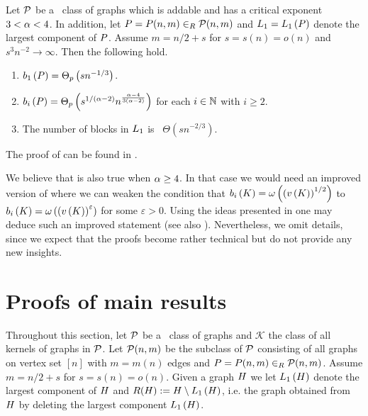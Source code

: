 \begin{thm}\label{CBthm:block_structure_general}
	Let $\mathcal{P}$ be a \pl\ class of graphs which is addable and has a critical exponent $3<\alpha<4$. In addition, let $P=P(n,m)\in_R \mathcal{P}(n,m)$ and $L_1=L_1\left(P\right)$ denote the largest component of $P$. Assume $m=n/2+s$ for $s=s(n)=o\left(n\right)$ and $s^3n^{-2} \to \infty$. Then the following hold.
	\begin{enumerate}
		\item\label{CBthm:block_structure_general_a}
		$b_{1}\left(P\right)=\Theta_p\left(sn^{-1/3}\right)$.
		\item\label{CBthm:block_structure_general_b}
		$b_{i}\left(P\right)=\Theta_p\left(s^{1/\left(\alpha-2\right)}n^{\frac{\alpha-4}{3(\alpha-2)}}\right)$ for each $i\in \mathbb{N}$ with $i\geq 2$.
		\item\label{CBthm:block_structure_general_c}
		The number of blocks in $L_1$ is \whp\ $\Theta\left(sn^{-2/3}\right)$.
	\end{enumerate}
\end{thm}
The proof of  can be found in .
\begin{remark}\label{CBrem:block_structure}
	We believe that  is also true when $\alpha\geq 4$. In that case we would need an improved version of  where we can weaken the condition that $b_{i}\left(K\right)=\omega\left(\left(v\left({K}\right)\right)^{1/2}\right)$ to $b_{i}\left(K\right)=\omega\left(\left(v\left({K}\right)\right)^{\varepsilon}\right)$ for some $\varepsilon>0$. Using the ideas presented in  one may deduce such an improved statement (see also ). Nevertheless, we omit details, since we expect that the proofs become rather technical but do not provide any new insights. 
\end{remark}

\section{Proofs of main results}\label{CBsec:proofs_main}
Throughout this section, let $\mathcal{P}$ be a \pl\ class of graphs and $\mathcal{K}$ the class of all kernels of graphs in $\mathcal{P}$. Let $\mathcal{P}(n,m)$ be the subclass of $\mathcal{P}$ consisting of all graphs on vertex set $[n]$ with $m=m(n)$ edges and $P=P(n,m) \in_R \mathcal {P}(n,m)$. Assume $m=n/2+s$ for $s=s(n)=o(n)$. Given a graph $H$ we let $L_1\left(H\right)$ denote the largest component of $H$ and $R(H):=H \setminus L_1\left(H\right)$, i.e. the graph obtained from $H$ by deleting the largest component $L_1\left(H\right)$.

